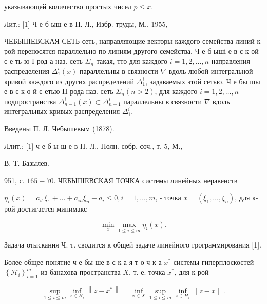 \documentclass[10pt]{article}
\begin{document}
указывающей количество простых чисел $p \leqslant x$.



Лит.: [1] Ч е б ыш е в П. Л., Избр. труды, М., 1955,



ЧЕБЫІІІЕВСКАЯ СЕТЬ-сеть, направляющие векторы каждого семейства линий к-рой переносятся параллельно по линиям другого семейства. Ч е б ыші е в с к ой с е ть ю I род а наз. сеть $\Sigma_{n}$ такая, тто для каждого $i=1,2, \ldots, n$ направления распределения $\Delta_{1}^{i}(x)$ параллельны в связности $\nabla$ вдоль любой интегральной кривой каждого из других распределений $\Delta_{1}^{i}$, задаваемых этой сетью. Ч е бы шы е в с к о й с етью II рода наз. сеть $\Sigma_{n}(n>2)$, для каждого $i=1,2, \ldots, n$ подпространства $\Delta_{n-1}^{i}(x) \subset \Delta_{n-1}^{i}$ параллельны в связности $\nabla$ вдоль интегральных кривых распределения $\Delta_{1}^{i}$.



Введены П. Л. Чебышевым (1878).



Ллит.: [1] ч е б ы ш е в П. Л., Полн. собр. соч., т. 5, М.,

В. Т. Базылев.

951, с. $165-70$. ЧЕБЫІІІЕВСКАЯ ТОЧКА системы линейных неравенств



$\eta_{i}(x)=a_{i 1} \xi_{1}+\ldots+a_{i n} \xi_{n}+a_{i} \leqslant 0, i=1, \ldots, m$, - точка $x=\left(\xi_{1}, \ldots, \xi_{n}\right)$, для к-рой достигается минимакс



\[

\min _{x} \max _{1 \leqslant i \leqslant m} \eta_{i}(x) .

\]



Задача отыскания Ч. т. сводится к общей задаче линейного грограммирования [1].



Более общее понятие-ч е бы ше в с к а я т о ч к а $x^{*}$ системы гиперплоскостей $\left\{\mathscr{H}_{i}\right\}_{i=1}^{m}$ из банахова пространства $X$, т. е. точка $x^{*}$, для к-рой



\[

\sup _{1 \leqslant i \leqslant m} \inf _{z \in H_{i}}\left\|z-x^{*}\right\|=\inf _{x \in X} \sup _{1 \leqslant i \leqslant m} \inf _{z \in H_{i}}\|z-x\| .

\]
\end{document}
